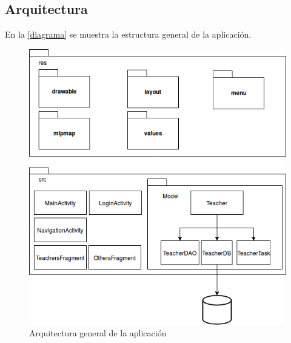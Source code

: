 \documentclass[12pt, a4paper, titlepage]{article}
\begin{document}
	\subsection{Arquitectura}
	
	En la \autoref{diagrama} se muestra la estructura general de la aplicación.
	
	\begin{figure}[h!]
		\begin{center}
			\includegraphics[scale=0.65]{img/diagrama.png}
			\caption{Arquitectura general de la aplicación}
			\label{diagrama}
		\end{center}
	\end{figure}
	
\end{document}
